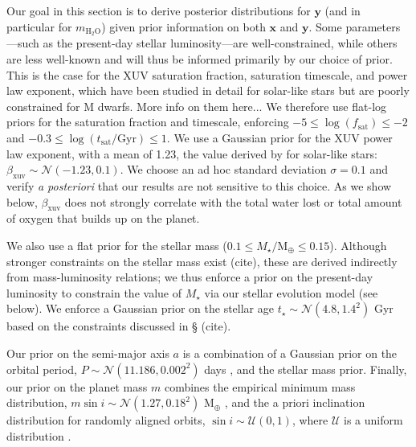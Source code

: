 \documentclass[]{emulateapj}
\newcommand{\note}[1]{{\color{red} #1}}
\newcommand{\cn}{\note{(cite)}}
\begin{document}
Our goal in this section is to derive posterior distributions for $\mathbf{y}$ (and in particular for $m_\mathrm{H_2O}$) 
given prior information on both 
$\mathbf{x}$ and $\mathbf{y}$. Some parameters---such as the present-day stellar luminosity---are well-constrained,
while others are less well-known and will thus be informed primarily by our choice of prior. This is the case for
the XUV saturation fraction, saturation timescale, and power law exponent, which have been studied in detail 
for solar-like stars \citep{Ribas05} but are poorly constrained for M dwarfs. \note{More info on them here...}
We therefore use flat-log priors for the saturation fraction and timescale, enforcing
$-5 \leq \log(f_\mathrm{sat}) \leq -2$ and $-0.3 \leq \log(t_\mathrm{sat} / \mathrm{Gyr}) \leq 1$. We use
a Gaussian prior for the XUV power law exponent, with a mean of 1.23, the value derived by \citep{Ribas05} for
solar-like stars: $\beta_\mathrm{xuv} \sim \mathcal{N}(-1.23, 0.1)$. We choose an ad hoc standard deviation
$\sigma = 0.1$ and verify \emph{a posteriori} that our results are not sensitive to this choice. As we show
below, $\beta_\mathrm{xuv}$ does not strongly correlate with the total water lost or total
amount of oxygen that builds up on the planet.

We also use a flat prior for the stellar mass ($0.1 \leq M_\star / \mathrm{M}_\oplus \leq 0.15$).
Although stronger constraints on the stellar mass exist \cn, these are derived indirectly from mass-luminosity relations; we thus
enforce a prior on the present-day luminosity to constrain the value of $M_\star$ via our stellar evolution model (see below).
We enforce a Gaussian prior on the stellar age $t_\star \sim \mathcal{N}(4.8, 1.4^2)$ Gyr based on the constraints discussed
in \S\cn. 

Our prior on the semi-major axis $a$ is a combination of a Gaussian prior on the orbital period, 
$P \sim \mathcal{N}(11.186, 0.002^2)$ days \citep{AngladaEscude16}, and the stellar mass prior. 
Finally, our prior on the planet mass $m$ combines the empirical minimum mass distribution,
$m\sin i \sim \mathcal{N}(1.27, 0.18^2)$ M$_\oplus$ \citep{AngladaEscude16}, and the a priori inclination distribution
for randomly aligned orbits, 
$\sin i \sim \mathcal{U}(0, 1)$, where $\mathcal{U}$ is a uniform distribution \citep[e.g.,][]{Luger17}.
\end{document}
